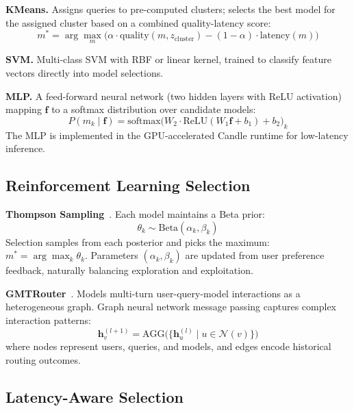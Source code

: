 \noindent\textbf{KMeans.}
Assigns queries to pre-computed clusters; selects the best model for the assigned cluster based on a combined quality-latency score:
\begin{equation}
  m^* = \arg\max_m \bigl(\alpha \cdot \text{quality}(m, z_\text{cluster}) - (1-\alpha) \cdot \text{latency}(m)\bigr)
\end{equation}

\noindent\textbf{SVM.}
Multi-class SVM with RBF or linear kernel, trained to classify feature vectors directly into model selections.

\noindent\textbf{MLP.}
A feed-forward neural network (two hidden layers with ReLU activation) mapping $\mathbf{f}$ to a softmax distribution over candidate models:
\begin{equation}
  P(m_k \mid \mathbf{f}) = \text{softmax}\bigl(W_2 \cdot \text{ReLU}(W_1 \mathbf{f} + b_1) + b_2\bigr)_k
\end{equation}
The MLP is implemented in the GPU-accelerated Candle runtime for low-latency inference.

\subsection{Reinforcement Learning Selection}

\noindent\textbf{Thompson Sampling}~\cite{thompson1933likelihood}.
Each model maintains a Beta prior:
\begin{equation}
  \theta_k \sim \text{Beta}(\alpha_k, \beta_k)
\end{equation}
Selection samples from each posterior and picks the maximum: $m^* = \arg\max_k \theta_k$.
Parameters $(\alpha_k, \beta_k)$ are updated from user preference feedback, naturally balancing exploration and exploitation.

\noindent\textbf{GMTRouter}~\cite{xie2025gmtrouter}.
Models multi-turn user-query-model interactions as a heterogeneous graph.
Graph neural network message passing captures complex interaction patterns:
\begin{equation}
  \mathbf{h}_v^{(l+1)} = \text{AGG}\bigl(\{\mathbf{h}_u^{(l)} \mid u \in \mathcal{N}(v)\}\bigr)
\end{equation}
where nodes represent users, queries, and models, and edges encode historical routing outcomes.

\subsection{Latency-Aware Selection}

